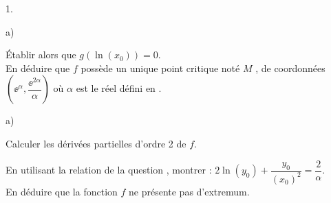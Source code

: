 \documentclass[11pt]{article}%
\begin{document}
\begin{exercice}[ESC 2005]
\begin{noliste}{1.}
\begin{noliste}{a)}
    \item Établir alors que $g(\ln (x_{0}))=0$.\\
    En déduire que $f$ possède un unique point critique noté $M$ , de 
    coordonnées $\left( \ee^{\alpha },\dfrac{\ee^{2\alpha }}{\alpha }\right) $ 
    où $\alpha $ est le réel défini en .
  \end{noliste}
  
  \item
  \begin{noliste}{a)}
    \item Calculer les dérivées partielles d'ordre 2 de $f$.
    
    \item En utilisant la relation de la question , montrer : $2\ln
    (y_{0})+\dfrac{y_{0}}{(x_{0})^{2}}=\dfrac{2}{\alpha }$.\\
    En déduire que la fonction $f$ ne présente pas d'extremum.
  \end{noliste}
\end{noliste}
\end{exercice}
\end{document}
